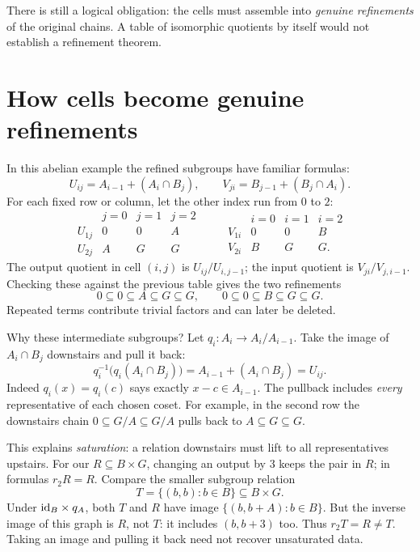 
There is still a logical obligation: the cells must assemble into
\emph{genuine refinements} of the original chains. A table of isomorphic
quotients by itself would not establish a refinement theorem.

\clearpage
\section{How cells become genuine refinements}\label{c:refinement}
In this abelian example the refined subgroups have familiar formulas:
\[
 U_{ij}=A_{i-1}+(A_i\cap B_j),\qquad
 V_{ji}=B_{j-1}+(B_j\cap A_i).
\]
For each fixed row or column, let the other index run from \(0\) to \(2\):
\[
\begin{array}{c|ccc}
 &j=0&j=1&j=2\\ \hline
 U_{1j}&0&0&A\\
 U_{2j}&A&G&G
\end{array}
\qquad
\begin{array}{c|ccc}
 &i=0&i=1&i=2\\ \hline
 V_{1i}&0&0&B\\
 V_{2i}&B&G&G .
\end{array}
\]
The output quotient in cell \((i,j)\) is
\(U_{ij}/U_{i,j-1}\); the input quotient is
\(V_{ji}/V_{j,i-1}\). Checking these against the previous table gives
the two refinements
\[
 0\subseteq0\subseteq A\subseteq G\subseteq G,\qquad
 0\subseteq0\subseteq B\subseteq G\subseteq G.
\]
Repeated terms contribute trivial factors and can later be deleted.

Why these intermediate subgroups? Let
\(q_i:A_i\to A_i/A_{i-1}\). Take the image of \(A_i\cap B_j\)
downstairs and pull it back:
\[
 q_i^{-1}\bigl(q_i(A_i\cap B_j)\bigr)
       =A_{i-1}+(A_i\cap B_j)=U_{ij}.
\]
Indeed \(q_i(x)=q_i(c)\) says exactly \(x-c\in A_{i-1}\).
The pullback includes \emph{every} representative of each chosen coset.
For example, in the second row the downstairs chain
\(0\subseteq G/A\subseteq G/A\) pulls back to
\(A\subseteq G\subseteq G\).

This explains \emph{saturation}: a relation downstairs must lift to all
representatives upstairs. For our \(R\subseteq B\times G\), changing an
output by \(3\) keeps the pair in \(R\); in formulas \(r_2R=R\).
Compare the smaller subgroup relation
\[
 T=\{(b,b):b\in B\}\subseteq B\times G.
\]
Under \(\mathrm{id}_B\times q_A\), both \(T\) and \(R\) have image
\(\{(b,b+A):b\in B\}\). But the inverse image of this graph is \(R\),
not \(T\): it includes \((b,b+3)\) too. Thus \(r_2T=R\ne T\).
Taking an image and pulling it back need not recover unsaturated data.

